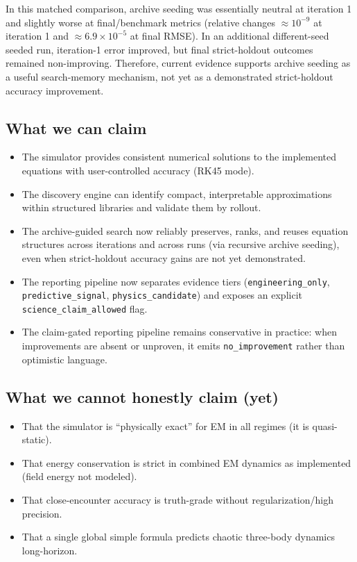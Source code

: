\documentclass[11pt]{article}
\begin{document}
In this matched comparison, archive seeding was essentially neutral at iteration 1 and slightly worse at final/benchmark metrics (relative changes $\approx 10^{-9}$ at iteration 1 and $\approx 6.9\times10^{-5}$ at final RMSE). In an additional different-seed seeded run, iteration-1 error improved, but final strict-holdout outcomes remained non-improving. Therefore, current evidence supports archive seeding as a useful search-memory mechanism, not yet as a demonstrated strict-holdout accuracy improvement.

\subsection{What we can claim}
\begin{itemize}
\item The simulator provides consistent numerical solutions to the implemented equations with user-controlled accuracy (RK45 mode).
\item The discovery engine can identify compact, interpretable approximations within structured libraries and validate them by rollout.
\item The archive-guided search now reliably preserves, ranks, and reuses equation structures across iterations and across runs (via recursive archive seeding), even when strict-holdout accuracy gains are not yet demonstrated.
\item The reporting pipeline now separates evidence tiers (\texttt{engineering\_only}, \texttt{predictive\_signal}, \texttt{physics\_candidate}) and exposes an explicit \texttt{science\_claim\_allowed} flag.
\item The claim-gated reporting pipeline remains conservative in practice: when improvements are absent or unproven, it emits \texttt{no\_improvement} rather than optimistic language.
\end{itemize}

\subsection{What we cannot honestly claim (yet)}
\begin{itemize}
\item That the simulator is ``physically exact'' for EM in all regimes (it is quasi-static).
\item That energy conservation is strict in combined EM dynamics as implemented (field energy not modeled).
\item That close-encounter accuracy is truth-grade without regularization/high precision.
\item That a single global simple formula predicts chaotic three-body dynamics long-horizon.
\end{itemize}
\end{document}
